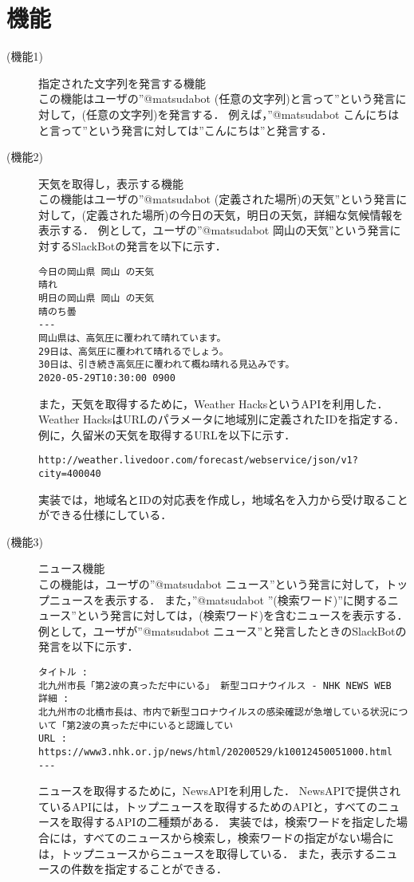 \documentclass[12pt]{jsarticle}
\begin{document}
\section{機能}
\begin{description}
\item[(機能1)] 指定された文字列を発言する機能\\
この機能はユーザの''@matsudabot (任意の文字列)と言って''という発言に対して，(任意の文字列)を発言する．
例えば，''@matsudabot こんにちはと言って''という発言に対しては''こんにちは''と発言する．

\item[(機能2)] 天気を取得し，表示する機能\\
この機能はユーザの''@matsudabot (定義された場所)の天気''という発言に対して，(定義された場所)の今日の天気，明日の天気，詳細な気候情報を表示する．
例として，ユーザの''@matsudabot 岡山の天気''という発言に対するSlackBotの発言を以下に示す．
\begin{verbatim}
今日の岡山県 岡山 の天気
晴れ
明日の岡山県 岡山 の天気
晴のち曇
---
岡山県は、高気圧に覆われて晴れています。
29日は、高気圧に覆われて晴れるでしょう。
30日は、引き続き高気圧に覆われて概ね晴れる見込みです。
2020-05-29T10:30:00 0900
\end{verbatim}
また，天気を取得するために，Weather HacksというAPIを利用した．
Weather HacksはURLのパラメータに地域別に定義されたIDを指定する．
例に，久留米の天気を取得するURLを以下に示す．
\begin{verbatim}
http://weather.livedoor.com/forecast/webservice/json/v1?city=400040
\end{verbatim}
実装では，地域名とIDの対応表を作成し，地域名を入力から受け取ることができる仕様にしている．

\item[(機能3)] ニュース機能\\
この機能は，ユーザの''@matsudabot ニュース''という発言に対して，トップニュースを表示する．
また，''@matsudabot ''(検索ワード)''に関するニュース''という発言に対しては，(検索ワード)を含むニュースを表示する．
例として，ユーザが''@matsudabot ニュース''と発言したときのSlackBotの発言を以下に示す．
\begin{verbatim}
タイトル :
北九州市長「第2波の真っただ中にいる」 新型コロナウイルス - NHK NEWS WEB
詳細 :
北九州市の北橋市長は、市内で新型コロナウイルスの感染確認が急増している状況について「第2波の真っただ中にいると認識してい
URL :
https://www3.nhk.or.jp/news/html/20200529/k10012450051000.html
---
\end{verbatim}
ニュースを取得するために，NewsAPIを利用した．
NewsAPIで提供されているAPIには，トップニュースを取得するためのAPIと，すべてのニュースを取得するAPIの二種類がある．
実装では，検索ワードを指定した場合には，すべてのニュースから検索し，検索ワードの指定がない場合には，トップニュースからニュースを取得している．
また，表示するニュースの件数を指定することができる．


\end{description}
\end{document}
